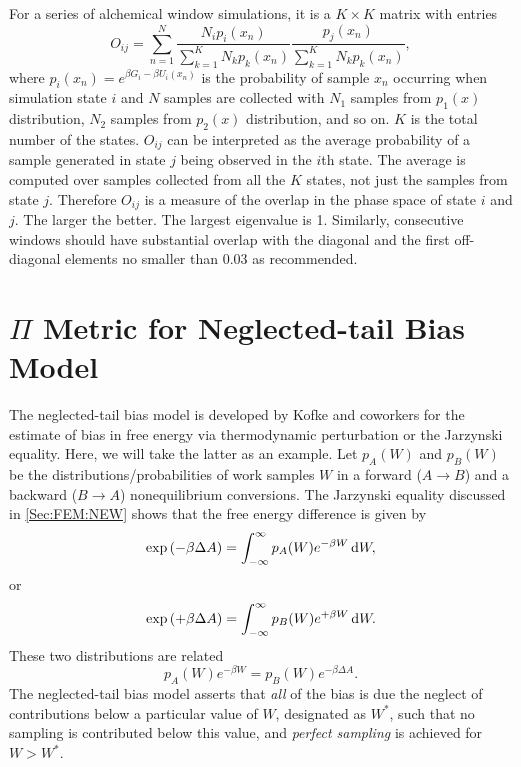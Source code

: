 For a series of alchemical window simulations, it is a $K \times K$ matrix with entries
\begin{equation}
O_{ij}=\sum\limits_{n=1}^{N}\frac{N_{i}p_{i}(x_{n})}{\sum\limits_{k=1}^{K}N_{k}p_{k}(x_{n})}\frac{p_{j}(x_{n})}{\sum\limits_{k=1}^{K}N_{k}p_{k}(x_{n})},
\end{equation}
where $p_{i}(x_{n})=e^{\beta G_{i}-\beta U_{i}(x_{n})}$ is the probability of sample $x_{n}$ occurring when simulation state $i$ and $N$ samples are collected with $N_{1}$ samples from $p_{1}(x)$ distribution, $N_{2}$ samples from $p_{2}(x)$ distribution, and so on. $K$ is the total number of the states. $O_{ij}$ can be interpreted as the average probability of a sample generated in state $j$ being observed in the $i$th state. The average is computed over samples collected from all the $K$ states, not just the samples from state $j$. Therefore $O_{ij}$ is a measure of the overlap in the phase space of state $i$ and $j$. The larger the better. The largest eigenvalue is 1.
Similarly, consecutive windows should have substantial overlap with the diagonal and the first off-diagonal elements no smaller than 0.03 as recommended\cite{KlimovichJCAMD2015}. 

\section{$\Pi$ Metric for Neglected-tail Bias Model\label{Sec:Eva:Pi}}
The neglected-tail bias model is developed by Kofke and coworkers for the estimate of bias in free energy via thermodynamic perturbation or the Jarzynski equality\cite{LuJCP2001,WuJCP2004}. Here, we will take the latter as an example. Let $p_A(W)$ and $p_B(W)$ be the distributions/probabilities of work samples $W$ in a forward ($A\to B$) and a backward ($B\to A$) nonequilibrium conversions. The Jarzynski equality discussed in \ref{Sec:FEM:NEW} shows that the free energy difference is given by
\begin{equation}
    \exp{(-\beta \Delta A)}=\int_{-\infty}^{\infty}p_A(W)e^{-\beta W}\mathop{}\!\mathrm{d} W,
\end{equation}
or
\begin{equation}
    \exp{(+\beta \Delta A)}=\int_{-\infty}^{\infty}p_B(W)e^{+\beta W}\mathop{}\!\mathrm{d} W.
\end{equation}
These two distributions are related
\begin{equation}
    p_A(W)e^{-\beta W}=p_B(W)e^{-\beta \Delta A}.
    \label{Eq:Eva:Pi:distributions_and_dA}
\end{equation}
The neglected-tail bias model asserts that \emph{all} of the bias is due the neglect of contributions below a particular value of $W$, designated as $W^\ast$, such that no sampling is contributed below this value, and \emph{perfect sampling} is achieved for $W>W^\ast$.

